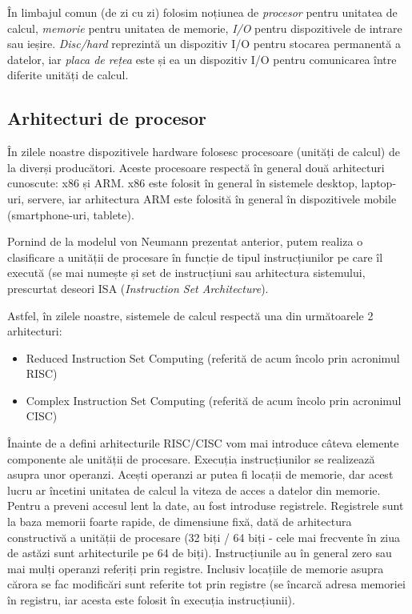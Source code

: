 În limbajul comun (de zi cu zi) folosim noțiunea de \textit{procesor} pentru unitatea de calcul, \textit{memorie} pentru unitatea de memorie, \textit{I/O} pentru dispozitivele de intrare sau ieșire.
\textit{Disc/hard} reprezintă un dispozitiv I/O pentru stocarea permanentă a datelor, iar \textit{placa de rețea} este și ea un dispozitiv I/O pentru comunicarea între diferite unități de calcul.

\subsection{Arhitecturi de procesor}
\label{sec:hw:class:cpu}

În zilele noastre dispozitivele hardware folosesc procesoare (unități de calcul) de la diverși producători.
Aceste procesoare respectă în general două arhitecturi cunoscute: x86 și ARM.
x86 este folosit în general în sistemele desktop, laptop-uri, servere, iar arhitectura ARM este folosită în general în dispozitivele mobile (smartphone-uri, tablete).

Pornind de la modelul von Neumann prezentat anterior, putem realiza o clasificare a unității de procesare în funcție de tipul instrucțiunilor pe care îl execută (se mai numește și set de instrucțiuni sau arhitectura sistemului, prescurtat deseori ISA (\textit{Instruction Set Architecture}).

Astfel, în zilele noastre, sistemele de calcul respectă una din următoarele 2 arhitecturi:

\begin{itemize}
  \item Reduced Instruction Set Computing (referită de acum încolo prin acronimul RISC) 
  \item Complex Instruction Set Computing (referită de acum încolo prin acronimul CISC) 
\end{itemize}

Înainte de a defini arhitecturile RISC/CISC vom mai introduce câteva elemente componente ale unității de procesare.
Execuția instrucțiunilor se realizează asupra unor operanzi.
Acești operanzi ar putea fi locații de memorie, dar acest lucru ar încetini unitatea de calcul la viteza de acces a datelor din memorie.
Pentru a preveni accesul lent la date, au fost introduse registrele.
Registrele sunt la baza memorii foarte rapide, de dimensiune fixă, dată de arhitectura constructivă a unității de procesare (32 biți / 64 biți - cele mai frecvente în ziua de astăzi sunt arhitecturile pe 64 de biți).
Instrucțiunile au în general zero sau mai mulți operanzi referiți prin registre.
Inclusiv locațiile de memorie asupra cărora se fac modificări sunt referite tot prin registre (se încarcă adresa memoriei în registru, iar acesta este folosit în execuția instrucțiunii).

